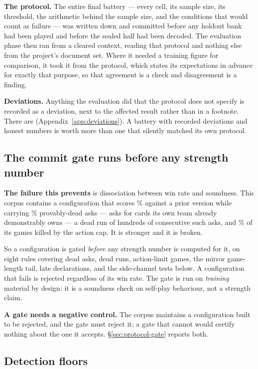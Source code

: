 \textbf{The protocol.} The entire final battery --- every cell, its sample size, its threshold, the
arithmetic behind the sample size, and the conditions that would count as failure --- was written
down and committed before any holdout bank had been played and before the sealed half had been
decoded. The evaluation phase then ran from a cleared context, reading that protocol and nothing
else from the project's document set. Where it needed a training figure for comparison, it took it
from the protocol, which states its expectations in advance for exactly that purpose, so that
agreement is a check and disagreement is a finding.

\textbf{Deviations.} Anything the evaluation did that the protocol does not specify is recorded as a
deviation, next to the affected result rather than in a footnote. There are \vsevenDeviations{}
(Appendix~\ref{app:deviations}). A battery with recorded deviations and honest numbers is worth more
than one that silently matched its own protocol.

\subsection{The commit gate runs before any strength number}
\label{sec:methodology-gate}

\textbf{The failure this prevents} is dissociation between win rate and soundness. This corpus
contains a configuration that scores \vsevenScoreboardTrapWin\% against a prior version while
carrying \vsevenScoreboardTrapDead\% provably-dead asks --- asks for cards its own team already
demonstrably owns --- a dead run of hundreds of consecutive such asks, and
\vsevenScoreboardTrapLimit\% of its games killed by the action cap. It is stronger and it is
broken.

So a configuration is gated \emph{before} any strength number is computed for it, on eight rules
covering dead asks, dead runs, action-limit games, the mirror game-length tail, late declarations,
and the side-channel tests below. A configuration that fails is rejected regardless of its win rate.
The gate is run on \emph{training} material by design: it is a soundness check on self-play
behaviour, not a strength claim.

\textbf{A gate needs a negative control.} The corpus maintains a configuration built to be
rejected, and the gate must reject it; a gate that cannot would certify nothing about the one it
accepts. \S\ref{sec:protocol-gate} reports both.

\subsection{Detection floors}
\label{sec:methodology-floor}


